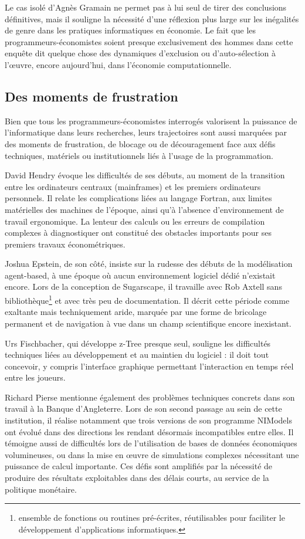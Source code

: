 Le cas isolé d’Agnès Gramain ne permet pas à lui seul de tirer des conclusions définitives, mais il souligne la nécessité d’une réflexion plus large sur les inégalités de genre dans les pratiques informatiques en économie. Le fait que les programmeurs-économistes soient presque exclusivement des hommes dans cette enquête dit quelque chose des dynamiques d’exclusion ou d’auto-sélection à l’œuvre, encore aujourd’hui, dans l’économie computationnelle.




\subsection{Des moments de frustration}

Bien que tous les programmeurs-économistes interrogés valorisent la puissance de l’informatique dans leurs recherches, leurs trajectoires sont aussi marquées par des moments de frustration, de blocage ou de découragement face aux défis techniques, matériels ou institutionnels liés à l’usage de la programmation. 

David Hendry évoque les difficultés de ses débuts, au moment de la transition entre les ordinateurs centraux (mainframes) et les premiers ordinateurs personnels. Il relate les complications liées au langage Fortran, aux limites matérielles des machines de l’époque, ainsi qu’à l’absence d’environnement de travail ergonomique. La lenteur des calculs ou les erreurs de compilation complexes à diagnostiquer ont constitué des obstacles importants pour ses premiers travaux économétriques. 

Joshua Epstein, de son côté, insiste sur la rudesse des débuts de la modélisation agent-based, à une époque où aucun environnement logiciel dédié n’existait encore. Lors de la conception de Sugarscape, il travaille avec Rob Axtell sans bibliothèque\footnote{ensemble de fonctions ou routines pré-écrites, réutilisables pour faciliter le développement d'applications informatiques.} et avec très peu de documentation. Il décrit cette période comme exaltante mais techniquement aride, marquée par une forme de bricolage permanent et de navigation à vue dans un champ scientifique encore inexistant. 

Urs Fischbacher, qui développe z-Tree presque seul, souligne les difficultés techniques liées au développement et au maintien du logiciel : il doit tout concevoir, y compris l’interface graphique permettant l’interaction en temps réel entre les joueurs. 

Richard Pierse mentionne également des problèmes techniques concrets dans son travail à la Banque d’Angleterre. Lors de son second passage au sein de cette institution, il réalise notamment que trois versions de son programme NIModels ont évolué dans des directions les rendant désormais incompatibles entre elles. Il témoigne aussi de difficultés lors de l’utilisation de bases de données économiques volumineuses, ou dans la mise en œuvre de simulations complexes nécessitant une puissance de calcul importante. Ces défis sont amplifiés par la nécessité de produire des résultats exploitables dans des délais courts, au service de la politique monétaire. 

